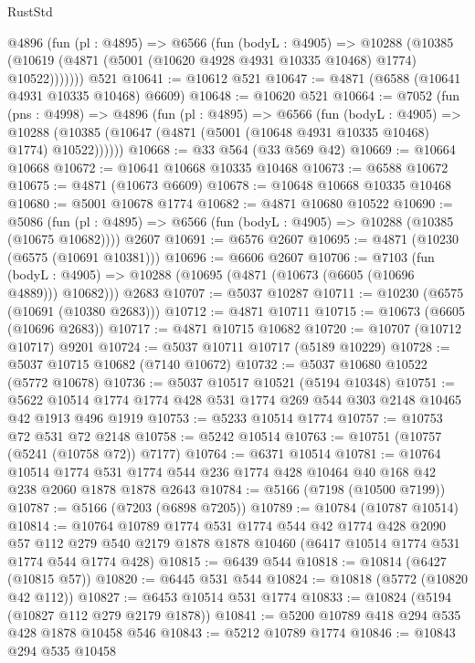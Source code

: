 \begin{lexlean}{RustStd}
\begin{coremodule}
      @4896
        (fun (pl : @4895) =>
        @6566
          (fun (bodyL : @4905) =>
          @10288
            (@10385 (@10619 (@4871 (@5001 (@10620 @4928 @4931 @10335 @10468) @1774) @10522)))))))
    @521
@10641 := @10612 @521
@10647 := @4871 (@6588 (@10641 @4931 @10335 @10468) @6609)
@10648 := @10620 @521
@10664 := @7052
    (fun (pns : @4998) =>
    @4896
      (fun (pl : @4895) =>
      @6566
        (fun (bodyL : @4905) =>
        @10288 (@10385 (@10647 (@4871 (@5001 (@10648 @4931 @10335 @10468) @1774) @10522))))))
@10668 := @33 @564 (@33 @569 @42)
@10669 := @10664 @10668
@10672 := @10641 @10668 @10335 @10468
@10673 := @6588 @10672
@10675 := @4871 (@10673 @6609)
@10678 := @10648 @10668 @10335 @10468
@10680 := @5001 @10678 @1774
@10682 := @4871 @10680 @10522
@10690 := @5086
    (fun (pl : @4895) => @6566 (fun (bodyL : @4905) => @10288 (@10385 (@10675 @10682))))
    @2607
@10691 := @6576 @2607
@10695 := @4871 (@10230 (@6575 (@10691 @10381)))
@10696 := @6606 @2607
@10706 := @7103
    (fun (bodyL : @4905) => @10288 (@10695 (@4871 (@10673 (@6605 (@10696 @4889))) @10682)))
    @2683
@10707 := @5037 @10287
@10711 := @10230 (@6575 (@10691 (@10380 @2683)))
@10712 := @4871 @10711
@10715 := @10673 (@6605 (@10696 @2683))
@10717 := @4871 @10715 @10682
@10720 := @10707 (@10712 @10717) @9201
@10724 := @5037 @10711 @10717 (@5189 @10229)
@10728 := @5037 @10715 @10682 (@7140 @10672)
@10732 := @5037 @10680 @10522 (@5772 @10678)
@10736 := @5037 @10517 @10521 (@5194 @10348)
@10751 := @5622 @10514 @1774 @1774 @428 @531 @1774 @269 @544 @303 @2148 @10465 @42 @1913 @496 @1919
@10753 := @5233 @10514 @1774
@10757 := @10753 @72 @531 @72 @2148
@10758 := @5242 @10514
@10763 := @10751 (@10757 (@5241 (@10758 @72)) @7177)
@10764 := @6371 @10514
@10781 := @10764
    @10514
    @1774
    @531
    @1774
    @544
    @236
    @1774
    @428
    @10464
    @40
    @168
    @42
    @238
    @2060
    @1878
    @1878
    @2643
@10784 := @5166 (@7198 (@10500 @7199))
@10787 := @5166 (@7203 (@6898 @7205))
@10789 := @10784 (@10787 @10514)
@10814 := @10764
    @10789
    @1774
    @531
    @1774
    @544
    @42
    @1774
    @428
    @2090
    @57
    @112
    @279
    @540
    @2179
    @1878
    @1878
    @10460
    (@6417 @10514 @1774 @531 @1774 @544 @1774 @428)
@10815 := @6439 @544
@10818 := @10814 (@6427 (@10815 @57))
@10820 := @6445 @531 @544
@10824 := @10818 (@5772 (@10820 @42 @112))
@10827 := @6453 @10514 @531 @1774
@10833 := @10824 (@5194 (@10827 @112 @279 @2179 @1878))
@10841 := @5200 @10789 @418 @294 @535 @428 @1878 @10458 @546
@10843 := @5212 @10789 @1774
@10846 := @10843 @294 @535 @10458

\end{coremodule}
\end{lexlean}
